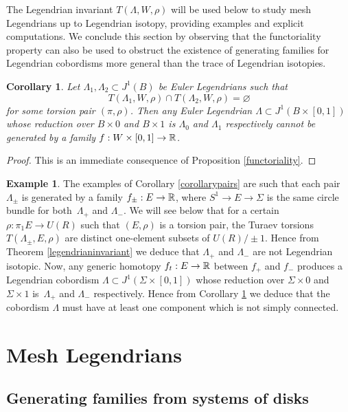 \documentclass[11pt]{article}
\numberwithin{equation}{section}\providecommand{\dpl}{\displaystyle}
\theoremstyle{plain}
\newtheorem{corollary}[theorem]{Corollary}
\theoremstyle{definition}
\newtheorem{example}[theorem]{Example}
\begin{document}
The Legendrian invariant $T(\Lambda, W, \rho)$ will be used below to study mesh Legendrians up to Legendrian isotopy, providing examples and explicit computations. We conclude this section by observing that the functoriality property can also be used to obstruct the existence of generating families for Legendrian cobordisms more general than the trace of Legendrian isotopies.

\begin{corollary}\label{cobordism}
Let $\Lambda_1, \Lambda_2 \subset J^1(B)$ be Euler Legendrians such that
\[
T(\Lambda_1,W,\rho) \cap T(\Lambda_2, W, \rho) = \varnothing
\]
for some torsion pair $(\pi, \rho)$. Then any Euler Legendrian $\Lambda \subset J^1(B \times [0,1])$ whose reduction over $B \times 0$ and $B \times 1$ is $\Lambda_0$ and $\Lambda_1$ respectively cannot be generated by a family $f:W \times [0,1]\to \mathbb{R}$.
\end{corollary}

\begin{proof} This is an immediate consequence of Proposition \ref{functoriality}. \end{proof}

\begin{example}
The examples of Corollary \ref{corollarypairs} are such that each pair $\Lambda_\pm$ is generated by a family $f_\pm : E \to \mathbb{R}$, where $S^1 \to E \to \Sigma$ is the same circle bundle for both~$\Lambda_+$ and $\Lambda_-$. We will see below that for a certain $\rho: \pi_1E \to U(R)$ such that $(E,\rho)$ is a torsion pair, the Turaev torsions $T(\Lambda_\pm, E, \rho)$ are distinct one-element subsets of $U(R) / \pm 1$. Hence from Theorem \ref{legendrianinvariant} we deduce that $\Lambda_+$ and $\Lambda_-$ are not Legendrian isotopic. Now, any generic homotopy $f_t:E \to \mathbb{R}$ between $f_+$ and $f_-$ produces a Legendrian cobordism $\Lambda \subset J^1(\Sigma \times [0,1])$ whose reduction over $\Sigma \times 0$ and $\Sigma \times 1$ is~$\Lambda_+$ and $\Lambda_-$ respectively. Hence from Corollary \ref{cobordism} we deduce that the cobordism $\Lambda$ must have at least one component which is not simply connected.
\end{example}

\section{Mesh Legendrians}\label{Section: mesh Legendrians}

\subsection{Generating families from systems of disks}\label{systems of disks}
\end{document}
